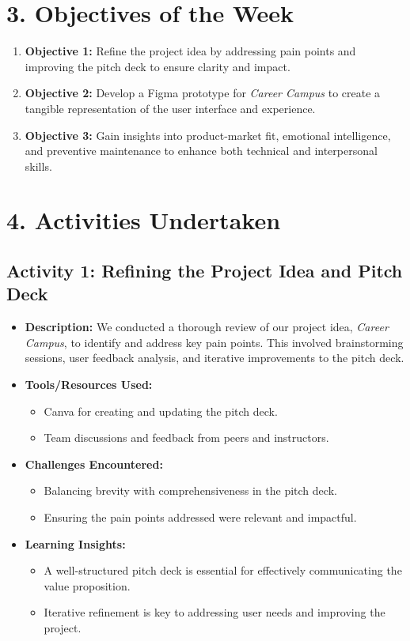 \documentclass{article}
\begin{document}
\section*{3. Objectives of the Week}
\begin{enumerate}
    \item \textbf{Objective 1:} Refine the project idea by addressing pain points and improving the pitch deck to ensure clarity and impact.
    \item \textbf{Objective 2:} Develop a Figma prototype for \textit{Career Campus} to create a tangible representation of the user interface and experience.
    \item \textbf{Objective 3:} Gain insights into product-market fit, emotional intelligence, and preventive maintenance to enhance both technical and interpersonal skills.
\end{enumerate}

\section*{4. Activities Undertaken}

\subsection*{Activity 1: Refining the Project Idea and Pitch Deck}
\begin{itemize}
    \item \textbf{Description:} We conducted a thorough review of our project idea, \textit{Career Campus}, to identify and address key pain points. This involved brainstorming sessions, user feedback analysis, and iterative improvements to the pitch deck.
    \item \textbf{Tools/Resources Used:}
    \begin{itemize}
        \item Canva for creating and updating the pitch deck.
        \item Team discussions and feedback from peers and instructors.
    \end{itemize}
    \item \textbf{Challenges Encountered:}
    \begin{itemize}
        \item Balancing brevity with comprehensiveness in the pitch deck.
        \item Ensuring the pain points addressed were relevant and impactful.
    \end{itemize}
    \item \textbf{Learning Insights:}
    \begin{itemize}
        \item A well-structured pitch deck is essential for effectively communicating the value proposition.
        \item Iterative refinement is key to addressing user needs and improving the project.
    \end{itemize}
\end{itemize}
\end{document}
